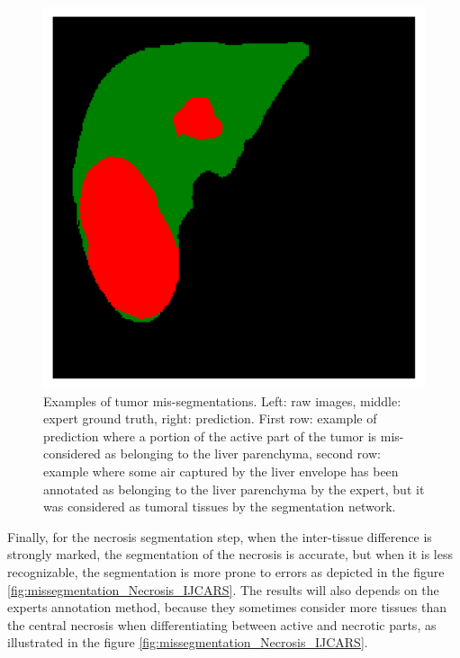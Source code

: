 {\begin{figure}[!ht]
\begin{mdframed}[backgroundcolor=blue!50,linecolor=blue!50]
\begin{minipage}{4cm}
	\end{minipage} \hspace{-0.3cm}
	\begin{minipage}{4cm}
		\includegraphics[width=\linewidth]{images/TumorMult_Pred_Pat0_4}
	\end{minipage} 
	\caption{Examples of tumor mis-segmentations. Left: raw images, middle: expert ground truth, right: prediction. First row: example of prediction where a portion of the active part of the tumor is mis-considered as belonging to the liver parenchyma, second row: example where some air captured by the liver envelope has been annotated as belonging to the liver parenchyma by the expert, but it was considered as tumoral tissues by the segmentation network.}
	\label{fig:missegmentation_Tumor_IJCARS}
	\end{mdframed}
\end{figure}
Finally, for the necrosis segmentation step, when the inter-tissue difference is strongly marked, the segmentation of the necrosis is accurate, but when it is less recognizable, the segmentation is more prone to errors as depicted in the figure \ref{fig:missegmentation_Necrosis_IJCARS}. The results will also depends on the experts annotation method, because they sometimes consider more tissues than the central necrosis when differentiating between active and necrotic parts, as illustrated in the figure \ref{fig:missegmentation_Necrosis_IJCARS}.
}
